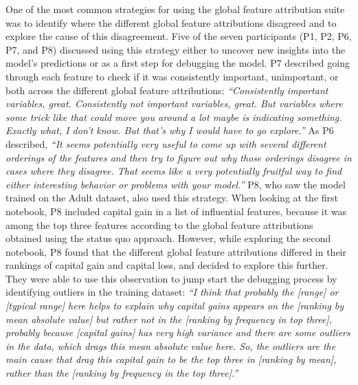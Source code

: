\documentclass[11pt,dvipdfmx]{article}
\begin{document}
One of the most common strategies for using the global feature
attribution suite was to identify where the different global feature
attributions disagreed and to explore the cause of this
disagreement. Five of the seven participants (P1, P2, P6, P7, and P8)
discussed using this strategy either to uncover new insights into the
model's predictions or as a first step for debugging the model. P7
described going through each feature to check if it was consistently
important, unimportant, or both across the different global feature
attributions: \textit{``Consistently important variables,
  great. Consistently not important variables, great. But variables
  where some trick like that could move you around a lot maybe is
  indicating something. Exactly what, I don't know. But that's why I
  would have to go explore.''} As P6 described, \textit{``It seems
  potentially very useful to come up with several different orderings
  of the features and then try to figure out why those orderings
  disagree in cases where they disagree. That seems like a very
  potentially fruitful way to find either interesting behavior or
  problems with your model.''}  P8, who saw the model trained on the
Adult dataset, also used this strategy.  When looking at the first
notebook, P8 included capital gain in a list of influential features,
because it was among the top three features according to the global
feature attributions obtained using the status quo approach. However,
while exploring the second notebook, P8 found that the different
global feature attributions differed in their rankings of capital gain
and capital loss, and decided to explore this further. They were able
to use this observation to jump start the debugging process by
identifying outliers in the training dataset: \textit{``I think that
  probably the [range] or [typical range] here helps to explain why
  capital gains appears on the [ranking by mean absolute value] but
  rather not in the [ranking by frequency in top three], probably
  because [capital gains] has very high variance and there are some
  outliers in the data, which drags this mean absolute value here. So,
  the outliers are the main cause that drag this capital gain to be
  the top three in [ranking by mean], rather than the [ranking by
    frequency in the top three].''} 
\end{document}
